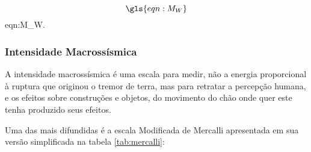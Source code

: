 \begin{equation}
	\gls{eqn:M_W}
	\label{eq:M_W}
\end{equation}
\glsdesc*{eqn:M_W}.


\subsubsection{Intensidade Macrossísmica}
\label{sec:intensidade}

A intensidade macrossísmica é uma escala para medir, não a energia proporcional
à ruptura que originou o tremor de terra, mas para retratar a percepção humana, e os efeitos sobre
construções e objetos, do movimento do chão onde quer este tenha produzido seus efeitos.

Uma das mais difundidas é a escala Modificada de Mercalli \citep{richter_1958} apresentada em sua versão simplificada
na tabela \ref{tab:mercalli}:

